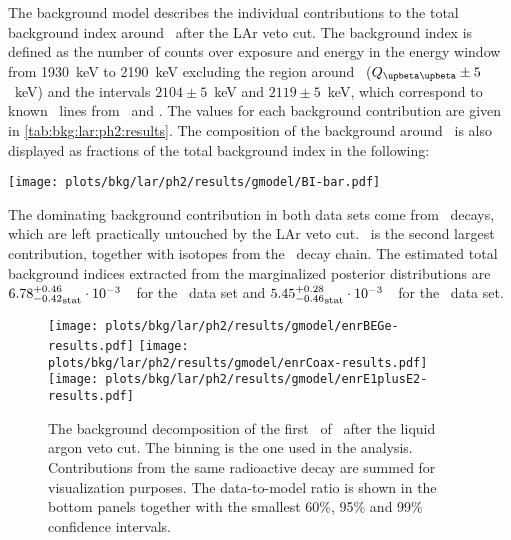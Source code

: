 The background model describes the individual contributions to the total background index
around \qbb\ after the LAr veto cut. The background index is defined as the number
of counts over exposure and energy in the energy window from 1930~keV to 2190~keV
excluding the region around \qbb\ ($\qbbM \pm 5$~keV) and the intervals $2104 \pm 5$~keV
and $2119 \pm 5$~keV, which correspond to known \g\ lines from \Tl\ and \Bih. The values
for each background contribution are given in \cref{tab:bkg:lar:ph2:results}. The
composition of the background around \qbb\ is also displayed as fractions of the total
background index in the following:
\begin{center}
  \texttt{[image: plots/bkg/lar/ph2/results/gmodel/BI-bar.pdf]}
\end{center}
The dominating background contribution in both data sets come from
\a\ decays, which are left practically untouched by the LAr veto cut. \kvz\ is the second
largest contribution, together with isotopes from the \Uh\ decay chain.
The estimated total
background indices extracted from the marginalized posterior distributions are
${6.78^{+0.46}_{-0.42}}_\text{stat} \cdot 10^{-3}$~\ctsper\ for the \enrBEGeII\ data set and
${5.45^{+0.28}_{-0.46}}_\text{stat} \cdot 10^{-3}$~\ctsper\ for the \enrCoaxII\ data set.

\begin{sidewaystable}
  \footnotesize
  \centering
  \caption{%
    Summary of the background decomposition after LAr veto cut. The number of
    reconstructed counts in the fit range and the BI at \qbb\ is listed for each component
    and each analysis data set. Marginalized modes, along with its smallest 68\% C.I., are
    reported as representatives of the marginalized posterior distributions.
  }\label{tab:bkg:lar:ph2:results}
  
\end{sidewaystable}

\begin{figure}
  \centering
  \texttt{[image: plots/bkg/lar/ph2/results/gmodel/enrBEGe-results.pdf]}
  \texttt{[image: plots/bkg/lar/ph2/results/gmodel/enrCoax-results.pdf]}
  \texttt{[image: plots/bkg/lar/ph2/results/gmodel/enrE1plusE2-results.pdf]}
  \caption{%
    The background decomposition of the first \gexpophasetwobkg\ of \gerdatwo\ after the
    liquid argon veto cut. The binning is the one used in the analysis. Contributions from
    the same radioactive decay are summed for visualization purposes. The data-to-model
    ratio is shown in the bottom panels together with the smallest 60\%, 95\% and 99\%
    confidence intervals.
  }\label{fig:bkg:lar:ph2:results}
\end{figure}

